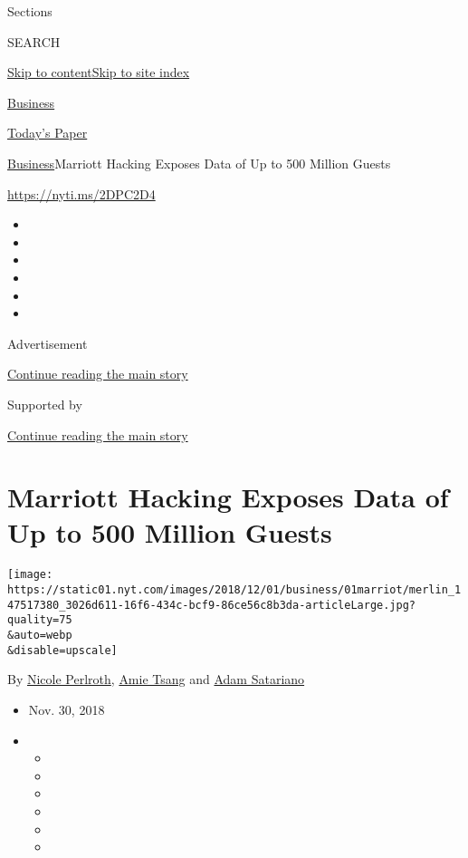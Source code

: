 Sections

SEARCH

\protect\hyperlink{site-content}{Skip to
content}\protect\hyperlink{site-index}{Skip to site index}

\href{https://www.nytimes.com/section/business}{Business}

\href{https://myaccount.nytimes.com/auth/login?response_type=cookie\&client_id=vi}{}

\href{https://www.nytimes.com/section/todayspaper}{Today's Paper}

\href{/section/business}{Business}\textbar{}Marriott Hacking Exposes
Data of Up to 500 Million Guests

\url{https://nyti.ms/2DPC2D4}

\begin{itemize}
\item
\item
\item
\item
\item
\item
\end{itemize}

Advertisement

\protect\hyperlink{after-top}{Continue reading the main story}

Supported by

\protect\hyperlink{after-sponsor}{Continue reading the main story}

\hypertarget{marriott-hacking-exposes-data-of-up-to-500-million-guests}{%
\section{Marriott Hacking Exposes Data of Up to 500 Million
Guests}\label{marriott-hacking-exposes-data-of-up-to-500-million-guests}}

\texttt{[image: https://static01.nyt.com/images/2018/12/01/business/01marriot/merlin\_147517380\_3026d611-16f6-434c-bcf9-86ce56c8b3da-articleLarge.jpg?quality=75\\\&auto=webp\\\&disable=upscale]}

By \href{https://www.nytimes.com/by/nicole-perlroth}{Nicole Perlroth},
\href{https://www.nytimes.com/by/amie-tsang}{Amie Tsang} and
\href{https://www.nytimes.com/by/adam-satariano}{Adam Satariano}

\begin{itemize}
\item
  Nov. 30, 2018
\item
  \begin{itemize}
  \item
  \item
  \item
  \item
  \item
  \item
  \end{itemize}
\end{itemize}

